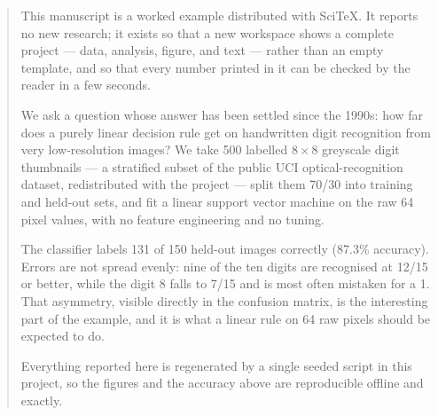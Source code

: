\begin{abstract}

This manuscript is a worked example distributed with SciTeX. It reports no new
research; it exists so that a new workspace shows a complete project --- data,
analysis, figure, and text --- rather than an empty template, and so that every
number printed in it can be checked by the reader in a few seconds.

We ask a question whose answer has been settled since the 1990s: how far does a
purely linear decision rule get on handwritten digit recognition from very
low-resolution images? We take 500 labelled $8\times8$ greyscale digit
thumbnails --- a stratified subset of the public UCI optical-recognition
dataset, redistributed with the project --- split them 70/30 into training and
held-out sets, and fit a linear support vector machine on the raw 64 pixel
values, with no feature engineering and no tuning.

The classifier labels 131 of 150 held-out images correctly (87.3\% accuracy).
Errors are not spread evenly: nine of the ten digits are recognised at 12/15 or
better, while the digit 8 falls to 7/15 and is most often mistaken for a 1.
That asymmetry, visible directly in the confusion matrix, is the interesting
part of the example, and it is what a linear rule on 64 raw pixels should be
expected to do.

Everything reported here is regenerated by a single seeded script in this
project, so the figures and the accuracy above are reproducible offline and
exactly.

\vspace{1em}
\end{abstract}


